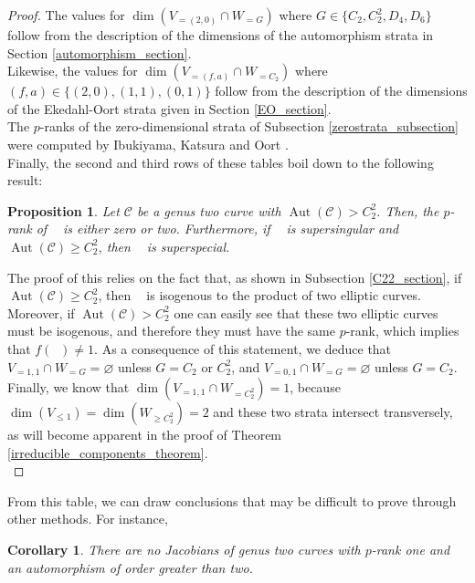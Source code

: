 \documentclass{amsart}
\newcommand{\calC}{\mathcal{C}}
\DeclareMathOperator{\Aut}{Aut}
\DeclareMathOperator{\Jac}{Jac}
\DeclareMathOperator{\Jacc}{\Jac(\mathcal{C})}
\numberwithin{equation}{section}
\newtheorem{proposition}[theorem]{Proposition}
\newtheorem{corollary}[theorem]{Corollary}
\theoremstyle{definition}
\theoremstyle{remark}
\begin{document}
\begin{proof}
The values for $\dim(V_{=(2,0)}\cap W_{= G})$ where $G\in\{C_2,C_2^2,D_4, D_6\}$ follow from the description of the dimensions of the automorphism strata in Section \ref{automorphism_section}.\\

Likewise, the values for $\dim(V_{=(f,a)}\cap W_{= C_2})$ where $(f,a)\in\{(2,0),(1,1),(0,1)\}$ follow from the description of the dimensions of the Ekedahl-Oort strata given in Section \ref{EO_section}.\\

The $p$-ranks of the zero-dimensional strata of Subsection \ref{zerostrata_subsection} were computed by Ibukiyama, Katsura and Oort \cite{Ibukiyama1986SupersingularNumbers}. \\

Finally, the second and third rows of these tables boil down to the following result:
\begin{proposition}\cite[Propositions 1.3 and 1.10]{Ibukiyama1986SupersingularNumbers}
Let $\calC$ be a genus two curve with $\Aut(\calC)> C_2^2$. Then, the $p$-rank of $\Jacc$ is either zero or two. Furthermore, if $\Jacc$ is supersingular and $\Aut(\calC)\geq C_2^2$, then $\Jacc$ is superspecial.
\end{proposition}
The proof of this relies on the fact that, as shown in Subsection \ref{C22_section}, if $\Aut(\calC)\geq C_2^2$, then $\Jacc$ is isogenous to the product of two elliptic curves. Moreover, if $\Aut(\calC)> C_2^2$ one can easily see that these two elliptic curves must be isogenous, and therefore they must have the same $p$-rank, which implies that $f(\Jacc)\neq 1$. As a consequence of this statement, we deduce that $V_{=1,1}\cap W_{=G}=\varnothing$ unless $G=C_2$ or $C_2^2$, and $V_{=0,1}\cap W_{=G}=\varnothing$ unless $G=C_2$.\\

Finally, we know that $\dim(V_{=1,1}\cap W_{=C_2^2})=1$, because $\dim(V_{\leq1})=\dim(W_{\geq C_2^2})=2$ and these two strata intersect transversely, as will become apparent in the proof of Theorem \ref{irreducible_components_theorem}.\qedhere\\
\end{proof}
From this table, we can draw conclusions that may be difficult to prove through other methods. For instance,
\begin{corollary}
There are no Jacobians of genus two curves with $p$-rank one and an automorphism of order greater than two.\\
\end{corollary}
\end{document}
